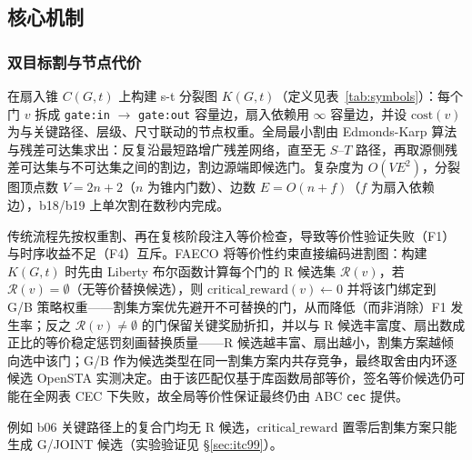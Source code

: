 \documentclass[journal]{IEEEtran}
\begin{document}
\subsection{核心机制}\label{sec:mechanism}

\subsubsection{双目标割与节点代价}
在扇入锥 $C(G, t)$ 上构建 s-t 分裂图 $K(G, t)$（定义见表~\ref{tab:symbols}）：每个门 $v$ 拆成 \texttt{gate:in} $\rightarrow$ \texttt{gate:out} 容量边，扇入依赖用 $\infty$ 容量边，并设 $\mathrm{cost}(v)$ 为与关键路径、层级、尺寸联动的节点权重。全局最小割由 Edmonds-Karp 算法与残差可达集求出：反复沿最短路增广残差网络，直至无 $S$--$T$ 路径，再取源侧残差可达集与不可达集之间的割边，割边源端即候选门。复杂度为 $O(VE^2)$，分裂图顶点数 $V=2n+2$（$n$ 为锥内门数）、边数 $E=O(n+f)$（$f$ 为扇入依赖边），b18/b19 上单次割在数秒内完成。

传统流程先按权重割、再在复核阶段注入等价检查，导致等价性验证失败（F1）与时序收益不足（F4）互斥。FAECO 将等价性约束直接编码进割图：构建 $K(G, t)$ 时先由 Liberty 布尔函数计算每个门的 R 候选集 $\mathcal{R}(v)$，若 $\mathcal{R}(v)=\emptyset$（无等价替换候选），则 $\mathrm{critical\_reward}(v) \leftarrow 0$ 并将该门绑定到 G/B 策略权重——割集方案优先避开不可替换的门，从而降低（而非消除）F1 发生率；反之 $\mathcal{R}(v)\neq\emptyset$ 的门保留关键奖励折扣，并以与 R 候选丰富度、扇出数成正比的等价稳定惩罚刻画替换质量——R 候选越丰富、扇出越小，割集方案越倾向选中该门；G/B 作为候选类型在同一割集方案内共存竞争，最终取舍由内环逐候选 OpenSTA 实测决定。由于该匹配仅基于库函数局部等价，签名等价候选仍可能在全网表 CEC 下失败，故全局等价性保证最终仍由 ABC \texttt{cec} 提供。

例如 b06 关键路径上的复合门均无 R 候选，$\mathrm{critical\_reward}$ 置零后割集方案只能生成 G/JOINT 候选（实验验证见 \S\ref{sec:itc99}）。
\end{document}
